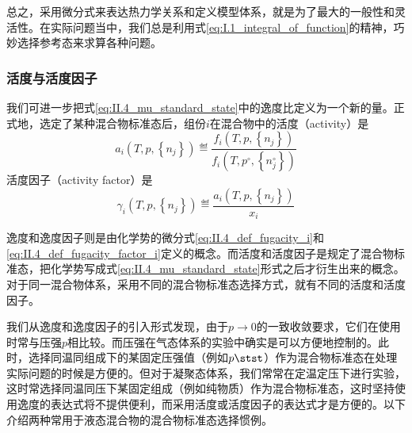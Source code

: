 \documentclass[main.tex]{subfiles}
\begin{document}
总之，采用微分式来表达热力学关系和定义模型体系，就是为了最大的一般性和灵活性。在实际问题当中，我们总是利用式\eqref{eq:I.1_integral_of_function}的精神，巧妙选择参考态来求算各种问题。

\subsubsection{活度与活度因子}
我们可进一步把式\eqref{eq:II.4_mu_standard_state}中的逸度比定义为一个新的量。正式地，选定了某种混合物标准态后，组份$i$在混合物中的活度（activity）是
\begin{equation}
    a_i\left(T,p,\left\{n_j\right\}\right)\eqdef\frac{f_i\left(T,p,\left\{n_j\right\}\right)}{f_i\left(T,p^\circ,\left\{n_j^\circ\right\}\right)}
\end{equation}
活度因子（activity factor）是
\begin{equation}
    \gamma_i\left(T,p,\left\{n_j\right\}\right)\eqdef\frac{a_i\left(T,p,\left\{n_j\right\}\right)}{x_i}
\end{equation}

逸度和逸度因子则是由化学势的微分式\eqref{eq:II.4_def_fugacity_i}和\eqref{eq:II.4_def_fugacity_factor_i}定义的概念。而活度和活度因子是规定了混合物标准态，把化学势写成式\eqref{eq:II.4_mu_standard_state}形式之后才衍生出来的概念。对于同一混合物体系，采用不同的混合物标准态选择方式，就有不同的活度和活度因子。

我们从逸度和逸度因子的引入形式发现，由于$p\rightarrow 0$的一致收敛要求，它们在使用时常与压强$p$相比较。而压强在气态体系的实验中确实是可以方便地控制的。此时，选择同温同组成下的某固定压强值（例如$p\stst$）作为混合物标准态在处理实际问题的时候是方便的。但对于凝聚态体系，我们常常在定温定压下进行实验，这时常选择同温同压下某固定组成（例如纯物质）作为混合物标准态，这时坚持使用逸度的表达式将不提供便利，而采用活度或活度因子的表达式才是方便的。以下介绍两种常用于液态混合物的混合物标准态选择惯例。
\end{document}
